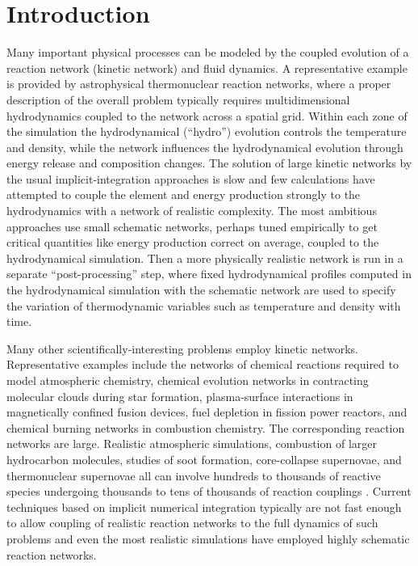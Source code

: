\documentclass[]{elsart}
\begin{document}
\section{Introduction}


Many important physical processes can be modeled by the coupled evolution of a 
reaction network (kinetic network) and fluid dynamics.  A representative example 
is provided by astrophysical thermonuclear reaction networks, where a proper 
description of the overall problem typically requires multidimensional 
hydrodynamics coupled to the network across a spatial grid.  Within each zone of 
the simulation the hydrodynamical (``hydro'') evolution controls the temperature 
and density, while the network influences the hydrodynamical evolution through 
energy release and composition changes. The solution of large kinetic networks 
by the usual implicit-integration approaches is slow and few calculations have 
attempted to couple the element and energy production strongly to the 
hydrodynamics with a network of realistic complexity.  The most ambitious 
approaches use small schematic networks, perhaps tuned empirically to get 
critical quantities like energy production correct on average, coupled to the 
hydrodynamical simulation.  Then a more physically realistic network is run in a 
separate ``post-processing'' step, where fixed hydrodynamical profiles computed 
in the hydrodynamical simulation with the schematic network are used to specify 
the variation of thermodynamic variables such as temperature and density with 
time.

Many other scientifically-interesting problems employ kinetic networks. 
Representative examples include the networks of chemical reactions required to 
model atmospheric chemistry, chemical evolution networks in contracting 
molecular clouds during star formation, plasma-surface interactions in 
magnetically confined fusion devices, fuel depletion in fission power reactors, 
and chemical burning networks in combustion chemistry. The corresponding 
reaction networks are large. Realistic atmospheric simulations, combustion of 
larger hydrocarbon molecules, studies of soot formation, core-collapse 
supernovae, and thermonuclear supernovae all can involve hundreds to thousands 
of reactive species undergoing thousands to tens of thousands of reaction 
couplings \cite{oran05,hix05}. Current techniques based on implicit numerical 
integration typically are not fast enough to allow coupling of realistic 
reaction networks to the full dynamics of such problems and even the most 
realistic simulations have employed highly schematic reaction networks.
\end{document}
